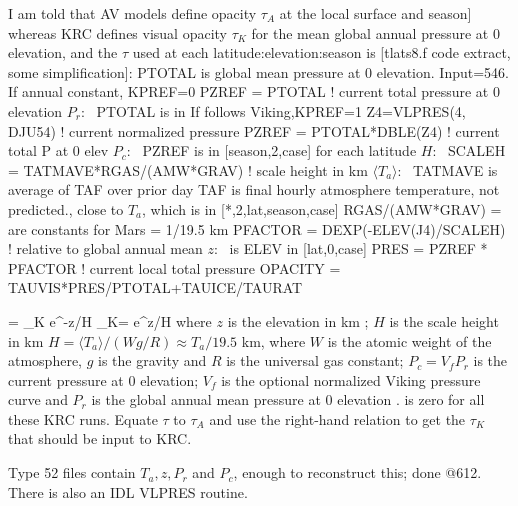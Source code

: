\documentclass{article}
\begin{document}
I am told that AV models define opacity $\tau_A$ at the local surface and
  season] whereas KRC defines visual opacity $\tau_K$ for the mean global annual
pressure at 0 elevation, and the $\tau$ used at each latitude:elevation:season
is [tlats8.f code extract, some simplification]:
\qii        PTOTAL is global mean pressure at 0 elevation. Input=546.
\qi      If annual constant, KPREF=0
\qii        PZREF = PTOTAL   ! current total pressure at 0 elevation
\qiii    $P_r$: \ PTOTAL is in 
\qi       If follows Viking,KPREF=1
 \qii         Z4=VLPRES(4, DJU54) ! current normalized pressure
 \qii         PZREF = PTOTAL*DBLE(Z4) ! current total P at 0 elev
\qiii $P_c$: \ PZREF is in [season,2,case]
 \qi        for each latitude
  \qii    $H$: \    SCALEH = TATMAVE*RGAS/(AMW*GRAV) ! scale height in km
  \qiii     $\langle T_a \rangle $: \     TATMAVE is average of TAF over prior day
  \qiii           TAF is final hourly atmosphere temperature, not predicted., close to $T_a$, which is in  [*,2,lat,season,case]
  \qiii           RGAS/(AMW*GRAV) = are constants for Mars = 1/19.5 km
  \qii         PFACTOR = DEXP(-ELEV(J4)/SCALEH) ! relative to global annual mean
\qiii $z$: \ is ELEV in  [lat,0,case]
  \qii         PRES = PZREF * PFACTOR ! current local total pressure 
 \qii        OPACITY = TAUVIS*PRES/PTOTAL+TAUICE/TAURAT 



\qbn \tau= \tau_K    e^{-z/H}  \tau_K= \tau {}  e^{z/H} 
where $z$ is the elevation in km ; $H$ is the scale height in km  $H= \langle T_a \rangle /(Wg/R) \approx  T_a/19.5 $ km, where $W$ is the atomic weight of the atmosphere, $g$ is the gravity and $R$ is the universal gas constant; $P_c=V_fP_r$ is the current pressure at 0 elevation; $V_f$ is the optional normalized Viking pressure curve and $P_r$ is the global annual mean pressure at 0 elevation .  is zero for all these KRC runs. Equate $\tau$ to  $\tau_A$ and use the right-hand relation to get the $\tau_K$  that should be input to KRC. 

Type 52 files contain  $T_a, z, P_r $ and $P_c$, enough to reconstruct this; done @612. There is also an IDL VLPRES routine.
\end{document}
